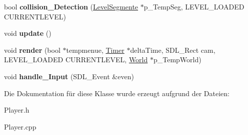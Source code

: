 \begin{DoxyCompactItemize}
\item 
\hypertarget{class_player_a4962a0e045b4d8cf30b49faec7a1b006}{bool {\bfseries collision\-\_\-\-Detection} (\hyperlink{class_level_segmente}{Level\-Segmente} $\ast$p\-\_\-\-Temp\-Seg, L\-E\-V\-E\-L\-\_\-\-L\-O\-A\-D\-E\-D C\-U\-R\-R\-E\-N\-T\-L\-E\-V\-E\-L)}\label{class_player_a4962a0e045b4d8cf30b49faec7a1b006}

\item 
\hypertarget{class_player_a82c3476f3e65a4e2ac6bcd040771bdd4}{void {\bfseries update} ()}\label{class_player_a82c3476f3e65a4e2ac6bcd040771bdd4}

\item 
\hypertarget{class_player_ad911072980c4a07dc37ececee2bfbca4}{void {\bfseries render} (bool $\ast$tempmenue, \hyperlink{class_timer}{Timer} $\ast$delta\-Time, S\-D\-L\-\_\-\-Rect cam, L\-E\-V\-E\-L\-\_\-\-L\-O\-A\-D\-E\-D C\-U\-R\-R\-E\-N\-T\-L\-E\-V\-E\-L, \hyperlink{class_world}{World} $\ast$p\-\_\-\-Temp\-World)}\label{class_player_ad911072980c4a07dc37ececee2bfbca4}

\item 
\hypertarget{class_player_af44299a346f97deb829bea5abed63d20}{void {\bfseries handle\-\_\-\-Input} (S\-D\-L\-\_\-\-Event \&even)}\label{class_player_af44299a346f97deb829bea5abed63d20}

\end{DoxyCompactItemize}


Die Dokumentation für diese Klasse wurde erzeugt aufgrund der Dateien\-:\begin{DoxyCompactItemize}
\item 
Player.\-h\item 
Player.\-cpp\end{DoxyCompactItemize}
